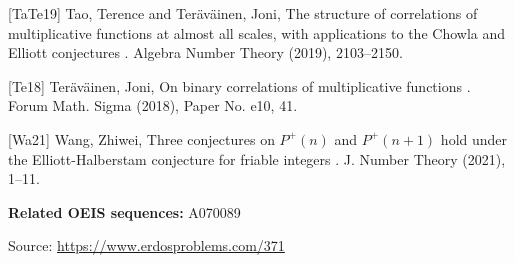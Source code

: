 \documentclass{article}
\begin{document}
[TaTe19] Tao, Terence and Ter\"{a}v\"{a}inen, Joni, The structure of correlations of multiplicative functions at almost all scales, with applications to the {C}howla and {E}lliott conjectures . Algebra Number Theory (2019), 2103--2150.

[Te18] Ter\"{a}v\"{a}inen, Joni, On binary correlations of multiplicative functions . Forum Math. Sigma (2018), Paper No. e10, 41.

[Wa21] Wang, Zhiwei, Three conjectures on {$P^+(n)$} and {$P^+(n+1)$} hold under the {E}lliott-{H}alberstam conjecture for friable integers . J. Number Theory (2021), 1--11.

\noindent\textbf{Related OEIS sequences:} A070089


\bigskip
\noindent\small{Source: \url{https://www.erdosproblems.com/371}}
\end{document}
